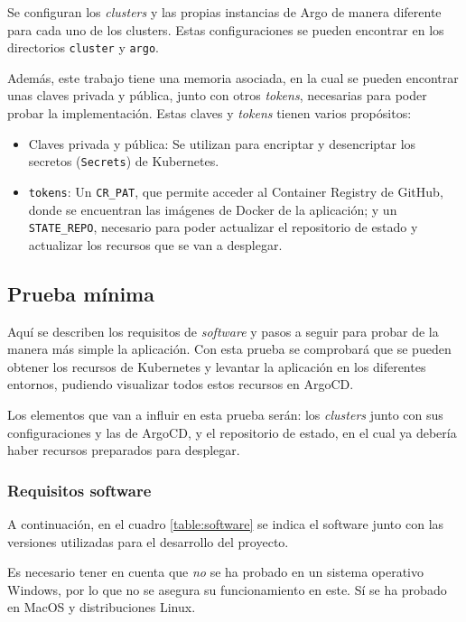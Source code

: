 Se configuran los \textit{clusters} y las propias instancias de Argo de manera diferente para cada uno de los clusters. Estas configuraciones se pueden encontrar en los directorios \texttt{cluster} y \texttt{argo}.

Además, este trabajo tiene una memoria asociada, en la cual se pueden encontrar unas claves privada y pública, junto con otros \textit{tokens}, necesarias para poder probar la implementación. Estas claves y \textit{tokens} tienen varios propósitos:

\begin{itemize}
  \item Claves privada y pública: Se utilizan para encriptar y desencriptar los secretos (\texttt{Secrets}) de Kubernetes.
  \item \texttt{tokens}: Un \texttt{CR\_PAT}, que permite acceder al Container Registry de GitHub, donde se encuentran las imágenes de Docker de la aplicación; y un \texttt{STATE\_REPO}, necesario para poder actualizar el repositorio de estado y actualizar los recursos que se van a desplegar.
\end{itemize}

\subsection*{Prueba mínima}

Aquí se describen los requisitos de \textit{software} y pasos a seguir para probar de la manera más simple la aplicación. Con esta prueba se comprobará que se pueden obtener los recursos de Kubernetes y levantar la aplicación en los diferentes entornos, pudiendo visualizar todos estos recursos en ArgoCD.

Los elementos que van a influir en esta prueba serán: los \textit{clusters} junto con sus configuraciones y las de ArgoCD, y el repositorio de estado, en el cual ya debería haber recursos preparados para desplegar.

\subsubsection*{Requisitos software}

A continuación, en el cuadro \ref{table:software} se indica el software junto con las versiones utilizadas para el desarrollo del proyecto.

Es necesario tener en cuenta que \textit{no} se ha probado en un sistema operativo Windows, por lo que no se asegura su funcionamiento en este. Sí se ha probado en MacOS y distribuciones Linux.

